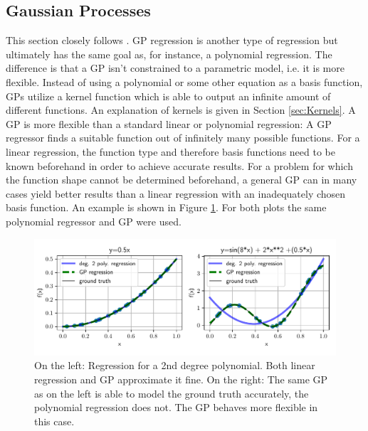 \documentclass[%
  a4paper,oneside,%
  11pt,%
  smallchapters,
  style=printdev,
  extramargin,
  green,%
  rgb, <cmyk>
  ]{tubsbook}
\begin{document}














\subsection{Gaussian Processes}
\label{sec:GPIntro}
This section closely follows \cite{rasmussen2006, gortler2019}.
GP regression is another type of regression but ultimately has the same goal as, for instance, a polynomial regression. The difference is that a GP isn't constrained to a parametric model, i.e. it is more flexible. Instead of using a polynomial or some other equation as a basis function, GPs utilize a kernel function which is able to output an infinite amount of different functions. An explanation of kernels is given in Section \ref{sec:Kernels}.
A GP is more flexible than a standard linear or polynomial regression: A GP regressor finds a suitable function out of infinitely many possible functions. For a linear regression, the function type and therefore basis functions need to be known beforehand in order to achieve accurate results. For a problem for which the function shape cannot be determined beforehand, a general GP can in many cases yield better results than a linear regression with an inadequately chosen basis function. An example is shown in Figure \ref{fig:GPvsReg}. For both plots the same polynomial regressor and GP were used.
\begin{figure}[!ht]
\begin{center}
\includegraphics[width=1\textwidth]{pics/GPvsReg}
\caption[GP regression versus Linear regression]{On the left: Regression for a 2nd degree polynomial. Both linear regression and GP approximate it fine. On the right: The same GP as on the left is able to model the ground truth accurately, the polynomial regression does not. The GP behaves more flexible in this case.}
\label{fig:GPvsReg}
\end{center}
\end{figure}
\end{document}
